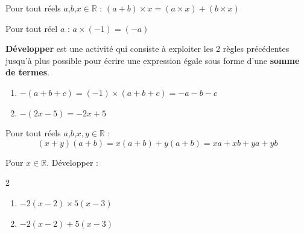\documentclass[main.tex]{subfiles}
\begin{document}
\begin{tBox}[frametitle={Règle 1 : Axiome de distributivité}] 
	Pour tout réels $a$,$b$,$x\in\mathbb{R}$ :  
	$ 	(a+b)\times x = (a\times x)+(b\times x)  	$ 
\end{tBox}
\begin{tBox}[frametitle={Règle 2}] Pour tout réel $a$ :  
	$a \times (-1) = (-a)$
\end{tBox} 
\begin{definition}\textbf{Développer} est une activité qui consiste à exploiter les 2 règles précédentes jusqu'à plus possible pour écrire une expression égale sous forme d'une \textbf{somme de termes}.
\end{definition}
\begin{example}\hfill  
		\begin{enumerate}[label={$\Alph*=$}, leftmargin=*] 
			\item $-(a + b + c) = (-1) × (a + b + c) =  -a-b-c$
			\item $- (2x-5) = -2x+5   $ 
		\end{enumerate} 
\end{example}  
\begin{tBox}[frametitle={La double distributivité}]
	Pour tout réels $a$,$b$,$x, y\in\mathbb{R}$ :  
	\setlength{\abovedisplayskip}{3pt}
	\setlength{\belowdisplayskip}{3pt}
	$$
		(x + y)(a + b)  = x(a + b) + y(a + b)  = xa + xb + ya + yb
		$$
\end{tBox} 
\begin{example} Pour $x\in \mathbb{R}$. Développer :
\begin{multicols}{2}
	\begin{enumerate}[label={$\Alph*=$},leftmargin=*]
		\item   $-2(x-2)\times 5(x-3)$
		\item   $-2(x-2)+5(x-3)$
	\end{enumerate}
\end{multicols}
\end{example}

%	 

\end{document}
